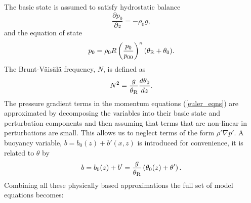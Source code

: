 \documentclass[times]{qjrms4}
\begin{document}
The basic state is assumed to satisfy hydrostatic balance \citep[e.g.][]{holton}
  \begin{equation} \label{hyd_bal} 
    \frac{\partial p_0}{\partial z} = - \rho_0 g, 
  \end{equation} 
and the equation of state
  \begin{equation} \label{eqnstat_basic} 
    p_0 = \rho_0 R \left(\frac{p_0}{p_{00}} \right)^{\kappa} (\theta_{\rm {R}} + \theta_0).
  \end{equation} 
The Brunt-V\"{a}is\"{a}l\"{a} frequency, $N$,  is defined as
  \begin{equation} \label{def_BVf}
     N^2 = \frac {g}{\theta_{\rm R}} \frac{d \theta_0}{dz}.
  \end{equation} 
%
The pressure gradient terms in the momentum equations (\ref{euler_eqns}) are approximated by 
decomposing the variables into their basic state and perturbation components and then assuming 
that terms that are non-linear in perturbations are small.  This allows us to neglect 
terms of the form $ \rho' \nabla p'$.
%
A buoyancy variable, $b = b_0(z) + b'(x,z)$ is introduced for convenience, it is related to
$\theta$ by
  \begin{equation}\label{def_buoy}
    b = b_0(z) + b' = \frac{g }{\theta_{\rm{R}}} \left(\theta_0(z) + \theta' \right).
  \end{equation}
Combining all these physically based approximations the full set of model equations becomes:
\end{document}
